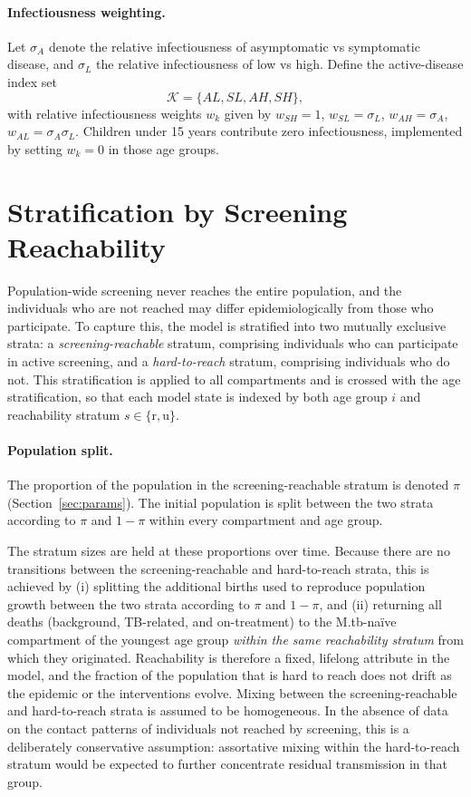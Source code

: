 \documentclass[11pt]{article}
\begin{document}
\paragraph{Infectiousness weighting.}
Let \(\sigma_A\) denote the relative infectiousness of asymptomatic vs symptomatic disease, and \(\sigma_L\) the relative infectiousness of low vs high. Define the active-disease index set
\[
\mathcal{K}=\{AL,SL,AH,SH\},
\]
with relative infectiousness weights \(w_k\) given by \(w_{SH}=1\), \(w_{SL}=\sigma_L\), \(w_{AH}=\sigma_A\), \(w_{AL}=\sigma_A\sigma_L\). Children under 15 years contribute zero infectiousness, implemented by setting \(w_k=0\) in those age groups.

\section{Stratification by Screening Reachability}
\label{sec:reachability}

Population-wide screening never reaches the entire population, and the individuals who are not reached may differ epidemiologically from those who participate. To capture this, the model is stratified into two mutually exclusive strata: a \emph{screening-reachable} stratum, comprising individuals who can participate in active screening, and a \emph{hard-to-reach} stratum, comprising individuals who do not. This stratification is applied to all compartments and is crossed with the age stratification, so that each model state is indexed by both age group \(i\) and reachability stratum \(s \in \{\mathrm{r}, \mathrm{u}\}\).

\paragraph{Population split.}
The proportion of the population in the screening-reachable stratum is denoted \(\pi\) (Section~\ref{sec:params}). The initial population is split between the two strata according to \(\pi\) and \(1-\pi\) within every compartment and age group.

The stratum sizes are held at these proportions over time. Because there are no transitions between the screening-reachable and hard-to-reach strata, this is achieved by (i) splitting the additional births used to reproduce population growth between the two strata according to \(\pi\) and \(1-\pi\), and (ii) returning all deaths (background, TB-related, and on-treatment) to the M.tb-na\"ive compartment of the youngest age group \emph{within the same reachability stratum} from which they originated. Reachability is therefore a fixed, lifelong attribute in the model, and the fraction of the population that is hard to reach does not drift as the epidemic or the interventions evolve.
Mixing between the screening-reachable and hard-to-reach strata is assumed to be homogeneous. In the absence of data on the contact patterns of individuals not reached by screening, this is a deliberately conservative assumption: assortative mixing within the hard-to-reach stratum would be expected to further concentrate residual transmission in that group.
\end{document}
